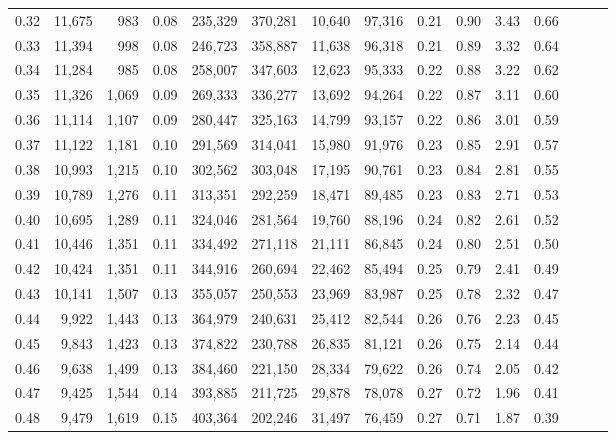 \begin{tabular}{rrrrrrrrrrrrrrr}
0.32 &  11,675 &    983 &  0.08 &  235,329 &  370,281 &   10,640 &   97,316 &  0.21 &  0.90 &  3.43 &      0.66 \\
0.33 &  11,394 &    998 &  0.08 &  246,723 &  358,887 &   11,638 &   96,318 &  0.21 &  0.89 &  3.32 &      0.64 \\
0.34 &  11,284 &    985 &  0.08 &  258,007 &  347,603 &   12,623 &   95,333 &  0.22 &  0.88 &  3.22 &      0.62 \\
0.35 &  11,326 &  1,069 &  0.09 &  269,333 &  336,277 &   13,692 &   94,264 &  0.22 &  0.87 &  3.11 &      0.60 \\
0.36 &  11,114 &  1,107 &  0.09 &  280,447 &  325,163 &   14,799 &   93,157 &  0.22 &  0.86 &  3.01 &      0.59 \\
0.37 &  11,122 &  1,181 &  0.10 &  291,569 &  314,041 &   15,980 &   91,976 &  0.23 &  0.85 &  2.91 &      0.57 \\
0.38 &  10,993 &  1,215 &  0.10 &  302,562 &  303,048 &   17,195 &   90,761 &  0.23 &  0.84 &  2.81 &      0.55 \\
0.39 &  10,789 &  1,276 &  0.11 &  313,351 &  292,259 &   18,471 &   89,485 &  0.23 &  0.83 &  2.71 &      0.53 \\
0.40 &  10,695 &  1,289 &  0.11 &  324,046 &  281,564 &   19,760 &   88,196 &  0.24 &  0.82 &  2.61 &      0.52 \\
0.41 &  10,446 &  1,351 &  0.11 &  334,492 &  271,118 &   21,111 &   86,845 &  0.24 &  0.80 &  2.51 &      0.50 \\
0.42 &  10,424 &  1,351 &  0.11 &  344,916 &  260,694 &   22,462 &   85,494 &  0.25 &  0.79 &  2.41 &      0.49 \\
0.43 &  10,141 &  1,507 &  0.13 &  355,057 &  250,553 &   23,969 &   83,987 &  0.25 &  0.78 &  2.32 &      0.47 \\
0.44 &   9,922 &  1,443 &  0.13 &  364,979 &  240,631 &   25,412 &   82,544 &  0.26 &  0.76 &  2.23 &      0.45 \\
0.45 &   9,843 &  1,423 &  0.13 &  374,822 &  230,788 &   26,835 &   81,121 &  0.26 &  0.75 &  2.14 &      0.44 \\
0.46 &   9,638 &  1,499 &  0.13 &  384,460 &  221,150 &   28,334 &   79,622 &  0.26 &  0.74 &  2.05 &      0.42 \\
0.47 &   9,425 &  1,544 &  0.14 &  393,885 &  211,725 &   29,878 &   78,078 &  0.27 &  0.72 &  1.96 &      0.41 \\
0.48 &   9,479 &  1,619 &  0.15 &  403,364 &  202,246 &   31,497 &   76,459 &  0.27 &  0.71 &  1.87 &      0.39 \\

\end{tabular}
